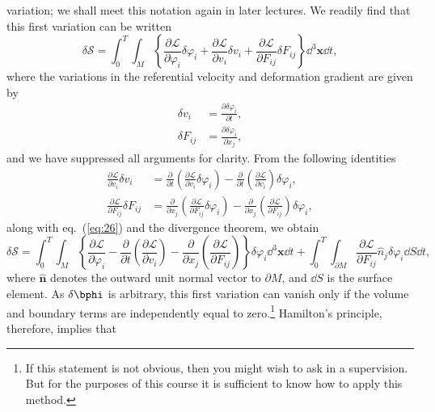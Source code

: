 variation; we shall meet this notation again in later lectures. We readily find that this 
first variation can be written
\begin{equation}
\delta\mathcal{S}=\int_{0}^{T}\int_{M}\left\{\frac{\partial\mathcal{L}}{\partial\varphi_{i}}\delta\varphi_{i}+
\frac{\partial\mathcal{L}}{\partial v_{i}}\delta v_{i}+\frac{\partial\mathcal{L}}{\partial F_{ij}}\delta F_{ij}\right\}\dd^{3}\mathbf{x}\dd t,
\label{eq:28}
\end{equation}
where the variations in the referential velocity and deformation gradient are given by
\begin{align}
\delta v_{i}&=\frac{\partial\delta\varphi_{i}}{\partial t}, \label{eq:29a}\\
\delta F_{ij}&=\frac{\partial\delta\varphi_{i}}{\partial x_{j}}, \label{eq:29b}
\end{align}
and we have suppressed all arguments for clarity. From the following identities
\begin{align}
\frac{\partial\mathcal{L}}{\partial v_{i}}\delta v_{i}&=\frac{\partial}{\partial t}\left(\frac{\partial\mathcal{L}}{\partial v_{i}}\delta\varphi_{i}
\right)-\frac{\partial}{\partial t}\left(\frac{\partial\mathcal{L}}{\partial v_{i}}\right)\delta\varphi_{i}, \label{eq:30}\\
\frac{\partial\mathcal{L}}{\partial F_{ij}}\delta F_{ij}&=\frac{\partial}{\partial x_{j}}\left(\frac{\partial\mathcal{L}}
{\partial F_{ij}}\delta\varphi_{i}\right)-\frac{\partial}{\partial x_{j}}\left(\frac{\partial\mathcal{L}}{\partial F_{ij}}\right)\delta\varphi_{i}, \label{eq:31}
\end{align}
along with eq.~(\ref{eq:26}) and the divergence theorem, we obtain
\begin{equation}
\delta\mathcal{S}=\int_{0}^{T}\int_{M}\left\{\frac{\partial\mathcal{L}}{\partial\varphi_{i}}-
\frac{\partial}{\partial t}\left(\frac{\partial\mathcal{L}}{\partial v_{i}}\right)-\frac{\partial}{\partial x_{j}}
\left(\frac{\partial\mathcal{L}}{\partial F_{ij}}\right)\right\}\delta\varphi_{i}\dd^{3}\mathbf{x}\dd t+
\int_{0}^{T}\int_{\partial M}\frac{\partial\mathcal{L}}{\partial F_{ij}}\hat{n}_{j}\delta\varphi_{i}\dd S\dd t,
\label{eq:32}
\end{equation}
where $\hat{\mathbf{n}}$ denotes the outward unit normal vector to $\partial M$, and $\dd S$ is the surface element. 
As $\delta\bphi$ is arbitrary, this first variation can vanish only if the volume and boundary terms are 
independently equal to zero.\footnote{If this statement is not obvious, then you might wish to ask in a supervision. But for the 
purposes of this course it is sufficient to know how to apply this method.} Hamilton's principle, therefore, implies that 
